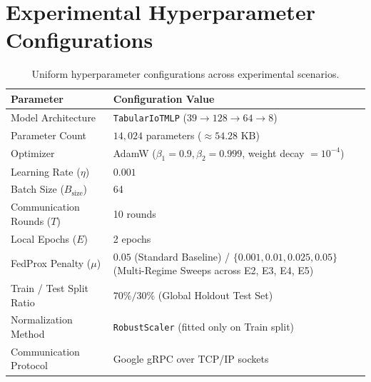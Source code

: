 \chapter{Experimental Hyperparameter Configurations}
\label{app:hyperparams}

\begin{table}[H]
\centering
\caption{Uniform hyperparameter configurations across experimental scenarios.}
\label{tab:hyperparam_details}
\begin{tabularx}{\textwidth}{l X}
\toprule
\textbf{Parameter} & \textbf{Configuration Value} \\
\midrule
Model Architecture & \texttt{TabularIoTMLP} ($39 \to 128 \to 64 \to 8$) \\
Parameter Count & $14,024$ parameters ($\approx 54.28\text{ KB}$) \\
Optimizer & AdamW ($\beta_1 = 0.9, \beta_2 = 0.999$, weight decay $= 10^{-4}$) \\
Learning Rate ($\eta$) & $0.001$ \\
Batch Size ($B_{\text{size}}$) & 64 \\
Communication Rounds ($T$) & 10 rounds \\
Local Epochs ($E$) & 2 epochs \\
FedProx Penalty ($\mu$) & $0.05$ (Standard Baseline) / $\{0.001, 0.01, 0.025, 0.05\}$ (Multi-Regime Sweeps across E2, E3, E4, E5) \\
Train / Test Split Ratio & $70\% / 30\%$ (Global Holdout Test Set) \\
Normalization Method & \texttt{RobustScaler} (fitted only on Train split) \\
Communication Protocol & Google gRPC over TCP/IP sockets \\
\bottomrule
\end{tabularx}
\end{table}
